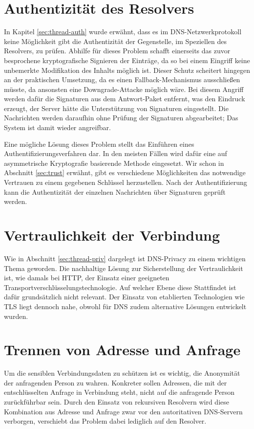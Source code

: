 \section{Authentizität des Resolvers}
In Kapitel \ref{sec:thread-auth} wurde erwähnt, dass es im DNS-Netzwerkprotokoll keine Möglichkeit gibt die Authentizität der Gegenstelle, im Speziellen des Resolvers, zu prüfen. Abhilfe für dieses Problem schafft einerseits das zuvor besprochene kryptografische Signieren der Einträge, da so bei einem Eingriff keine unbemerkte Modifikation des Inhalts möglich ist. Dieser Schutz scheitert hingegen an der praktischen Umsetzung, da es einen Fallback-Mechanismus ausschließen müsste, da ansonsten eine Downgrade-Attacke möglich wäre\cite{Bau2010}. Bei diesem Angriff werden dafür die Signaturen aus dem Antwort-Paket entfernt, was den Eindruck erzeugt, der Server hätte die Unterstützung von Signaturen eingestellt. Die Nachrichten werden daraufhin ohne Prüfung der Signaturen abgearbeitet; Das System ist damit wieder angreifbar. 

Eine mögliche Lösung dieses Problem stellt das Einführen eines Authentifizierungsverfahren dar. In den meisten Fällen wird dafür eine auf asymmetrische Kryptografie basierende Methode eingesetzt. Wir schon in Abschnitt \ref{sec:trust} erwähnt, gibt es verschiedene Möglichkeiten das notwendige Vertrauen zu einem gegebenen Schlüssel herzustellen. Nach der Authentifizierung kann die Authentizität der einzelnen Nachrichten über Signaturen geprüft werden.

\section{Vertraulichkeit der Verbindung}
Wie in Abschnitt \ref{sec:thread-priv} dargelegt ist DNS-Privacy zu einem wichtigen Thema geworden. Die nachhaltige Lösung zur Sicherstellung der Vertraulichkeit ist, wie damals bei HTTP, der Einsatz einer geeigneten Transportverschlüsselungstechnologie. Auf welcher Ebene diese Stattfindet ist dafür grundsätzlich nicht relevant. Der Einsatz von etablierten Technologien wie TLS liegt dennoch nahe, obwohl für DNS zudem alternative Lösungen entwickelt wurden. 

\section{Trennen von Adresse und Anfrage}
\label{sec:goals-sourceanon}
Um die sensiblen Verbindungsdaten zu schützen ist es wichtig, die Anonymität der anfragenden Person zu wahren. Konkreter sollen Adressen, die mit der entschlüsselten Anfrage in Verbindung steht, nicht auf die anfragende Person zurückführbar sein. Durch den Einsatz von rekursiven Resolvern wird diese Kombination aus Adresse und Anfrage zwar vor den autoritativen DNS-Servern verborgen, verschiebt das Problem dabei lediglich auf den Resolver. 

